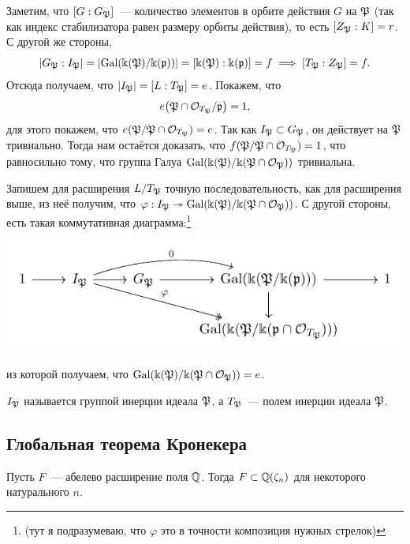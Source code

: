 	 Заметим, что $[G : G_{\mathfrak{P}}]$~--- количество элементов в орбите действия $G$ на $\mathfrak{P}$ (так как индекс стабилизатора равен размеру орбиты действия), то есть $[Z_{\mathfrak{P}} : K] = r$.  С другой же стороны, 
	 \[
	 	\left\lvert G_{\fP} : I_{\fP} \right\rvert = \left|\Gal\lr*{\Bbbk\lr*{\fP}/\Bbbk\lr*{\fp}}\right| = \left[ \Bbbk\lr*{\fP} : \Bbbk\lr*{\fp} \right] = f \implies [T_{\fP} : Z_{\fP}] = f.
	 \]
	 Отсюда получаем, что $|I_{\mathfrak{P}}| = [L : T_{\mathfrak{P}}] = e$. Покажем, что 
	 \[
	 	e\lr*{\fP \cap \cO_{T_{\fP}}/\fp} = 1,
	 \]
	 для этого покажем, что $e(\mathfrak{P}/\mathfrak{P} \cap \mathcal{O}_{T_{\mathfrak{P}}}) = e$. Так как $I_{\mathfrak{P}} \subset G_{\mathfrak{P}}$, он действует на $\mathfrak{P}$ тривиально. Тогда нам остаётся доказать, что $f(\mathfrak{P}/\mathfrak{P} \cap \mathcal{O}_{T_{\mathfrak{P}}}) = 1$, что равносильно тому, что группа Галуа $\operatorname{Gal}(\Bbbk(\mathfrak{P})/\Bbbk(\mathfrak{P} \cap \mathcal{O}_{\mathfrak{P}}))$ тривиальна. 

	 Запишем для расширения $L/T_{\mathfrak{P}}$ точную последовательность, как для расширения выше, из неё получим, что $\varphi: I_{\mathfrak{P}} \twoheadrightarrow \operatorname{Gal}(\Bbbk(\mathfrak{P})/\Bbbk(\mathfrak{P} \cap \mathcal{O}_{\mathfrak{P}}))$. С другой стороны, есть такая коммутативная диаграмма:\footnote{(тут я подразумеваю, что $\varphi$ это в точности композиция нужных стрелок)} 
	 \begin{center}
	 	\includegraphics{lectures/6/pictures/cd_45.pdf}
	 \end{center}
	 из которой получаем, что $\operatorname{Gal}(\Bbbk(\mathfrak{P})/\Bbbk(\mathfrak{P} \cap \mathcal{O}_{\mathfrak{P}})) = e$. 


	 \begin{definition} 
	 	$I_{\mathfrak{P}}$ называется группой инерции идеала $\mathfrak{P}$, а $T_{\mathfrak{P}}$~--- полем инерции идеала $\mathfrak{P}$. 
	 \end{definition}

\subsection{Глобальная теорема Кронекера}

	 \begin{theorem} 
	 	Пусть $F$~--- абелево расширение поля $\mathbb{Q}$. Тогда $F \subset \mathbb{Q}(\zeta_{n})$ для некоторого натурального $n$.
	 \end{theorem}

